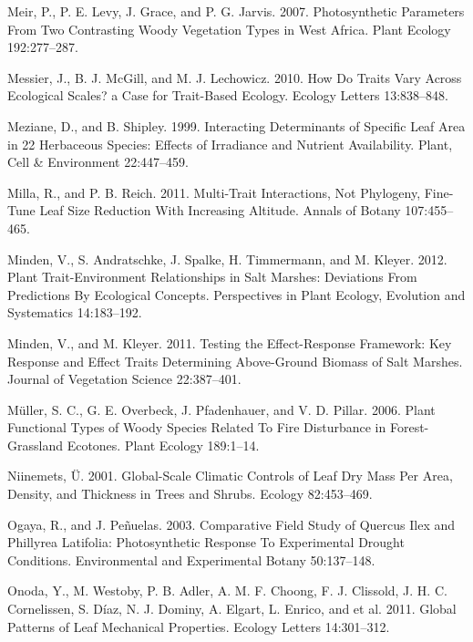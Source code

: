 \documentclass[11pt]{article}
\begin{document}
\begin{hangparas}{1.5em}{1}
\hypertarget{citeproc_bib_item_72}{Meir, P., P. E. Levy, J. Grace, and P. G. Jarvis. 2007. Photosynthetic Parameters From Two Contrasting Woody Vegetation Types in West Africa. Plant Ecology 192:277–287.}

\hypertarget{citeproc_bib_item_73}{Messier, J., B. J. McGill, and M. J. Lechowicz. 2010. How Do Traits Vary Across Ecological Scales? a Case for Trait-Based Ecology. Ecology Letters 13:838–848.}

\hypertarget{citeproc_bib_item_74}{Meziane, D., and B. Shipley. 1999. Interacting Determinants of Specific Leaf Area in 22 Herbaceous Species: Effects of Irradiance and Nutrient Availability. Plant, Cell \& Environment 22:447–459.}

\hypertarget{citeproc_bib_item_75}{Milla, R., and P. B. Reich. 2011. Multi-Trait Interactions, Not Phylogeny, Fine-Tune Leaf Size Reduction With Increasing Altitude. Annals of Botany 107:455–465.}

\hypertarget{citeproc_bib_item_76}{Minden, V., S. Andratschke, J. Spalke, H. Timmermann, and M. Kleyer. 2012. Plant Trait-Environment Relationships in Salt Marshes: Deviations From Predictions By Ecological Concepts. Perspectives in Plant Ecology, Evolution and Systematics 14:183–192.}

\hypertarget{citeproc_bib_item_77}{Minden, V., and M. Kleyer. 2011. Testing the Effect-Response Framework: Key Response and Effect Traits Determining Above-Ground Biomass of Salt Marshes. Journal of Vegetation Science 22:387–401.}

\hypertarget{citeproc_bib_item_78}{Müller, S. C., G. E. Overbeck, J. Pfadenhauer, and V. D. Pillar. 2006. Plant Functional Types of Woody Species Related To Fire Disturbance in Forest-Grassland Ecotones. Plant Ecology 189:1–14.}

\hypertarget{citeproc_bib_item_79}{Niinemets, Ü. 2001. Global-Scale Climatic Controls of Leaf Dry Mass Per Area, Density, and Thickness in Trees and Shrubs. Ecology 82:453–469.}

\hypertarget{citeproc_bib_item_80}{Ogaya, R., and J. Peñuelas. 2003. Comparative Field Study of Quercus Ilex and Phillyrea Latifolia: Photosynthetic Response To Experimental Drought Conditions. Environmental and Experimental Botany 50:137–148.}

\hypertarget{citeproc_bib_item_81}{Onoda, Y., M. Westoby, P. B. Adler, A. M. F. Choong, F. J. Clissold, J. H. C. Cornelissen, S. Díaz, N. J. Dominy, A. Elgart, L. Enrico, and et al. 2011. Global Patterns of Leaf Mechanical Properties. Ecology Letters 14:301–312.}


\end{hangparas}
\end{document}
